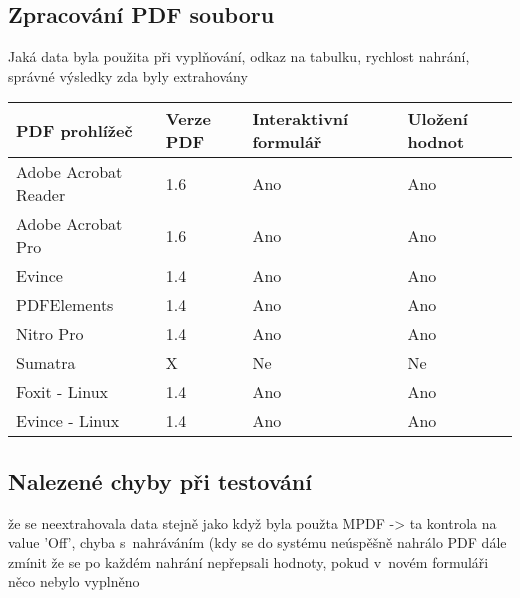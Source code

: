\subsection{Zpracování PDF souboru}
Jaká data byla použita při vyplňování, odkaz na tabulku, rychlost nahrání, správné výsledky zda byly extrahovány

\begin{table}[h!]
\centering
\begin{tabular}{|l|l|l|l|} 
\hline
\textbf{PDF prohlížeč} & \textbf{Verze PDF} & \textbf{Interaktivní formulář} & \textbf{Uložení hodnot}  \\ 
\hline
Adobe Acrobat Reader   & 1.6                & Ano                            & Ano                      \\ 
\hline
Adobe Acrobat Pro      & 1.6                & Ano                            & Ano                      \\ 
\hline
Evince                 & 1.4                & Ano                            & Ano                      \\ 
\hline
PDFElements            & 1.4                & Ano                            & Ano                      \\ 
\hline
Nitro Pro              & 1.4                & Ano                            & Ano                      \\ 
\hline
Sumatra                & X                  & Ne                             & Ne                       \\ 
\hline
Foxit - Linux          & 1.4                & Ano                            & Ano                      \\ 
\hline
Evince - Linux         & 1.4                & Ano                            & Ano                      \\
\hline
\end{tabular}
\end{table}

\subsection{Nalezené chyby při testování}
že se neextrahovala data stejně jako když byla použta MPDF -> ta kontrola na value 'Off', chyba s~nahráváním (kdy se do systému neúspěšně nahrálo PDF
dále zmínit že se po každém nahrání nepřepsali hodnoty, pokud v~novém formuláři něco nebylo vyplněno

